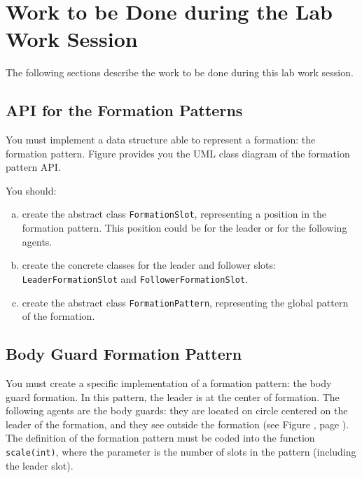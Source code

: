 \documentclass[article,english,nodocumentinfo]{multiagentfrreport}
\begin{document}
\section{Work to be Done during the Lab Work Session}

The following sections describe the work to be done during this lab work session.

\subsection{API for the Formation Patterns}

You must implement a data structure able to represent a formation: the formation pattern.
Figure  provides you the UML class diagram of the formation pattern API.


You should:
\begin{enumerate}[a)]
\item create the abstract class \texttt{FormationSlot}, representing a position in the formation pattern. This position could be for the leader or for the following agents.
\item create the concrete classes for the leader and follower slots: \texttt{LeaderFormationSlot} and \texttt{FollowerFormationSlot}.
\item create the abstract class \texttt{FormationPattern}, representing the global pattern of the formation.
\end{enumerate}

\subsection{Body Guard Formation Pattern}

You must create a specific implementation of a formation pattern: the body guard formation.
In this pattern, the leader is at the center of formation.
The following agents are the body guards: they are located on circle centered on the leader of the formation, and they see outside the formation (see Figure , page ).
The definition of the formation pattern must be coded into the function \texttt{scale(int)}, where the parameter is the number of slots in the pattern (including the leader slot).

\end{document}
